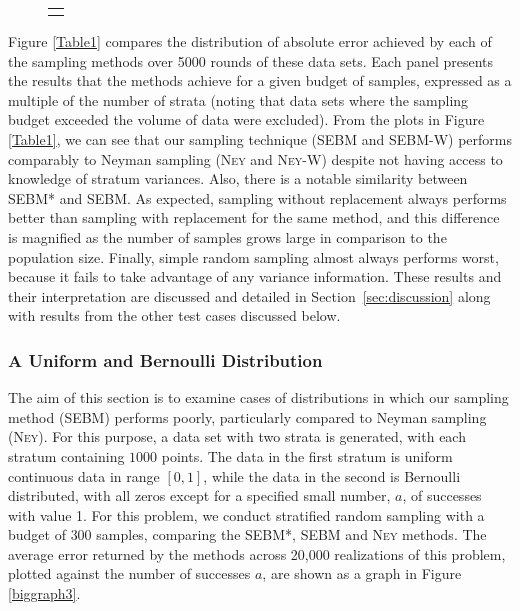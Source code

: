 \documentclass[]{interact}
\theoremstyle{plain}%
\theoremstyle{definition}
\theoremstyle{remark}
\begin{document}
\begin{figure*}[hbtp]
\begin{subfigure}[t]{0.5\textwidth}
\begin{tabular}{m{79mm}}
\begin{tikzpicture}[scale=0.8]
\begin{axis}
				\end{axis}
			\end{tikzpicture}
		\end{tabular}
    \end{subfigure}
    \caption{Distribution of numerical absolute errors across 5000 rounds of beta-distributed data, for different methods of stratified sampling. 
    Each plot shows absolute errors for different numbers of samples multiplied by the number of strata, $N$, e.g. $10N$ samples means that the test problem has a sample budget of ten times the number of strata. The whiskers show the 9th and 91st percentiles, data points outside this range are not shown.}
\label{Table1}
\end{figure*}


Figure \ref{Table1} compares the distribution of absolute error achieved by each of the sampling methods over 5000 rounds of these data sets.
Each panel presents the results that the methods achieve for a given budget of samples, 
expressed as a multiple of the number of strata (noting that data sets where the sampling budget exceeded the volume of data were excluded).
From the plots in Figure \ref{Table1}, we can see that our sampling technique (SEBM and SEBM-W) performs comparably to
Neyman sampling (\textsc{Ney} and \textsc{Ney-W}) despite not having access to knowledge of stratum variances.
Also, there is a notable similarity between SEBM* and SEBM.
As expected, sampling without replacement always performs better than sampling with replacement for the same method, and this difference is magnified as the number of samples grows large in comparison to the population size. 
Finally, simple random sampling almost always performs worst, because it fails to take advantage of any variance information.
These results and their interpretation are discussed and detailed in Section~\ref{sec:discussion} along with results from the other test cases discussed below.



\subsubsection{A Uniform and Bernoulli Distribution}
\label{sec:dataset2}
The aim of this section is to examine cases of distributions in which our sampling method (SEBM) performs poorly, particularly compared to Neyman sampling (\textsc{Ney}).
For this purpose, a data set with two strata is generated, with each stratum containing $1000$ points. 
The data in the first stratum is uniform continuous data in range $[0,1]$, while the data in the second is Bernoulli distributed, with all zeros except for a specified small number, $a$, of successes with value 1.
For this problem, we conduct stratified random sampling with a budget of $300$ samples, comparing the SEBM*, SEBM and \textsc{Ney} methods.
The average error returned by the methods across 20,000 realizations of this problem, plotted against the number of successes $a$, are shown as a graph in Figure \ref{biggraph3}.
\end{document}
